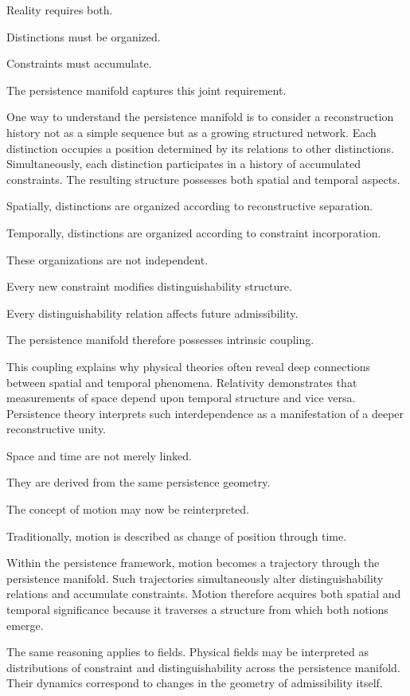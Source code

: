 \documentclass[12pt,oneside]{article}
\theoremstyle{definition}
\begin{document}
Reality requires both.

Distinctions must be organized.

Constraints must accumulate.

The persistence manifold captures this joint requirement.

One way to understand the persistence manifold is to consider a reconstruction history not as a simple sequence but as a growing structured network. Each distinction occupies a position determined by its relations to other distinctions. Simultaneously, each distinction participates in a history of accumulated constraints. The resulting structure possesses both spatial and temporal aspects.

Spatially, distinctions are organized according to reconstructive separation.

Temporally, distinctions are organized according to constraint incorporation.

These organizations are not independent.

Every new constraint modifies distinguishability structure.

Every distinguishability relation affects future admissibility.

The persistence manifold therefore possesses intrinsic coupling.

This coupling explains why physical theories often reveal deep connections between spatial and temporal phenomena. Relativity demonstrates that measurements of space depend upon temporal structure and vice versa. Persistence theory interprets such interdependence as a manifestation of a deeper reconstructive unity.

Space and time are not merely linked.

They are derived from the same persistence geometry.

The concept of motion may now be reinterpreted.

Traditionally, motion is described as change of position through time.

Within the persistence framework, motion becomes a trajectory through the persistence manifold. Such trajectories simultaneously alter distinguishability relations and accumulate constraints. Motion therefore acquires both spatial and temporal significance because it traverses a structure from which both notions emerge.

The same reasoning applies to fields. Physical fields may be interpreted as distributions of constraint and distinguishability across the persistence manifold. Their dynamics correspond to changes in the geometry of admissibility itself.
\end{document}

